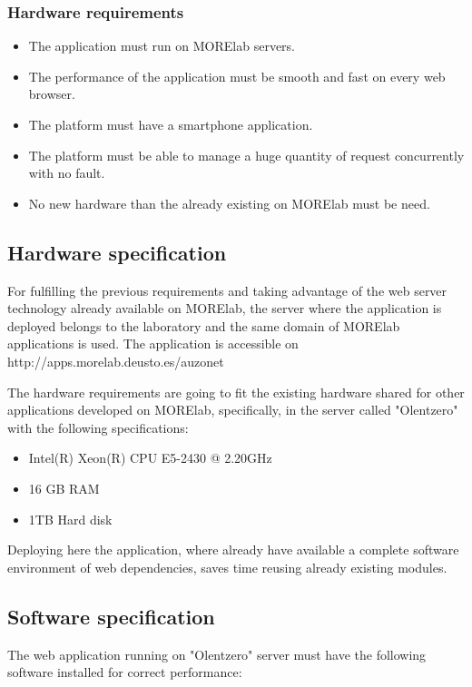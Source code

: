 \documentclass{DeustoFDP}
\begin{document}
\subsubsection{Hardware requirements}
\begin{itemize}
	\item The application must run on MORElab servers.
	\item The performance of the application must be smooth and fast on every web browser.
	\item The platform must have a smartphone application.
	\item The platform must be able to manage a huge quantity of request concurrently with no fault.
	\item No new hardware than the already existing on MORElab must be need.
\end{itemize}
\subsection{Hardware specification}
For fulfilling the previous requirements and taking advantage of the web server technology already available on MORElab, the server where the application is deployed belongs to the laboratory and the same domain of MORElab applications is used. The application is accessible on http://apps.morelab.deusto.es/auzonet

The hardware requirements are going to fit the existing hardware shared for other applications developed on MORElab, specifically, in the server called "Olentzero" with the following specifications:

\begin{itemize}
	\item Intel(R) Xeon(R) CPU E5-2430 @ 2.20GHz
	\item 16 GB RAM
	\item 1TB Hard disk
\end{itemize}

Deploying here the application, where already have available a complete software environment of web dependencies, saves time reusing already existing modules.

\subsection{Software specification}
The web application running on "Olentzero" server must have the following software installed for correct performance:
\end{document}
